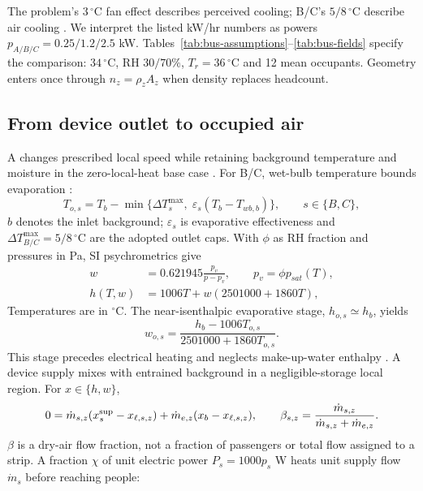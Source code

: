 The problem's $3\,^{\circ}\mathrm C$ fan effect describes perceived cooling; B/C's $5/8\,^{\circ}\mathrm C$ describe air cooling \cite{problem}. We interpret the listed kW/hr numbers as powers $p_{A/B/C}=0.25/1.2/2.5$ kW. Tables~\ref{tab:bus-assumptions}--\ref{tab:bus-fields} specify the comparison: $34\,^{\circ}\mathrm C$, RH $30/70\%$, $T_r=36\,^{\circ}\mathrm C$ and 12 mean occupants. Geometry enters once through $n_z=\rho_zA_z$ when density replaces headcount.

\subsection{From device outlet to occupied air}
A changes prescribed local speed while retaining background temperature and moisture in the zero-local-heat base case \cite{fanguide}. For B/C, wet-bulb temperature bounds evaporation \cite{evapequip}:
\begin{equation}
 T_{o,s}=T_b-\min\{\Delta T_s^{\max},\;\varepsilon_s(T_b-T_{wb,b})\},
 \qquad s\in\{B,C\},
\label{eq:outlet}
\end{equation}
$b$ denotes the inlet background; $\varepsilon_s$ is evaporative effectiveness and $\Delta T_{B/C}^{\max}=5/8\,^{\circ}\mathrm C$ are the adopted outlet caps. With $\phi$ as RH fraction and pressures in Pa, SI psychrometrics give \cite{psychrolib}
\begin{align}
 w&=0.621945\frac{p_v}{p-p_v},\qquad p_v=\phi p_{sat}(T),\\
 h(T,w)&=1006T+w(2501000+1860T),
\label{eq:enthalpy}
\end{align}
Temperatures are in $^{\circ}$C. The near-isenthalpic evaporative stage, $h_{o,s}\simeq h_b$, yields
\begin{equation}
 w_{o,s}=\frac{h_b-1006T_{o,s}}{2501000+1860T_{o,s}}.
\end{equation}
This stage precedes electrical heating and neglects make-up-water enthalpy \cite{evap}. A device supply mixes with entrained background in a negligible-storage local region. For $x\in\{h,w\}$,
\begin{equation}
 0=\dot m_{s,z}(x_s^{\rm sup}-x_{\ell,s,z})+
 \dot m_{e,z}(x_b-x_{\ell,s,z}),\qquad
 \beta_{s,z}=\frac{\dot m_{s,z}}{\dot m_{s,z}+\dot m_{e,z}}.
\label{eq:delivery-balance}
\end{equation}
$\beta$ is a dry-air flow fraction, not a fraction of passengers or total flow assigned to a strip. A fraction $\chi$ of unit electric power $P_s=1000p_s$ W heats unit supply flow $\dot m_s$ before reaching people:
